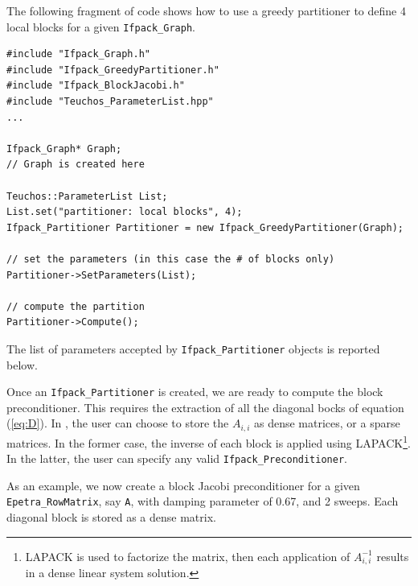 The following fragment of code shows how to use a greedy partitioner to define
4 local blocks for a given \verb!Ifpack_Graph!.

\begin{verbatim}
#include "Ifpack_Graph.h"
#include "Ifpack_GreedyPartitioner.h"
#include "Ifpack_BlockJacobi.h"
#include "Teuchos_ParameterList.hpp"
...

Ifpack_Graph* Graph;   
// Graph is created here

Teuchos::ParameterList List;
List.set("partitioner: local blocks", 4);
Ifpack_Partitioner Partitioner = new Ifpack_GreedyPartitioner(Graph);

// set the parameters (in this case the # of blocks only)
Partitioner->SetParameters(List);

// compute the partition
Partitioner->Compute();
\end{verbatim}

The list of parameters accepted by \verb!Ifpack_Partitioner! objects is
reported below.

\smallskip


\medskip

Once an \verb!Ifpack_Partitioner! is created, we are ready to
compute the block preconditioner. This requires the extraction of
all the diagonal bocks of equation (\ref{eq:D}). In \ifpack, the
user can choose to store the $A_{i,i}$ as dense matrices, or a sparse
matrices. In the former case, the inverse of each block is applied using
LAPACK\footnote{LAPACK is used to factorize the matrix, then each application
  of $A_{i,i}^{-1}$ results in a dense linear system solution.}. In the
  latter, the user can specify any valid \verb!Ifpack_Preconditioner!.

As an example, we now create a block Jacobi preconditioner for 
a given \verb!Epetra_RowMatrix!, say \verb!A!,
with damping parameter of 0.67, and 2 sweeps. Each diagonal block is stored as a dense
matrix.

